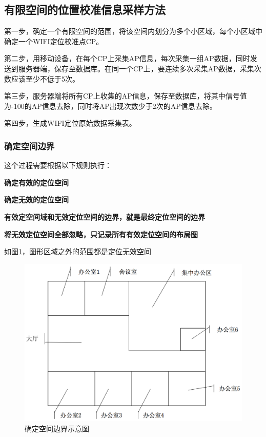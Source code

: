 \documentclass[UTF8, twocolumn ]{ctexart}
\begin{document}
\subsection{有限空间的位置校准信息采样方法}
第一步，确定一个有限空间的范围，将该空间内划分为多个小区域，每个小区域中确定一个WIFI定位校准点CP。
\par
第二步，用移动设备，在每个CP上采集AP信息，每次采集一组AP数据，同时发送到服务器端，保存至数据库。在同一个CP上，要连续多次采集AP数据，采集次数应该至少不低于5次。
\par
第三步，服务器端将所有CP上收集的AP信息，保存至数据库，将其中信号值为-100的AP信息去除，同时将AP出现次数少于2次的AP信息去除。
\par
第四步，生成WIFI定位原始数据采集表。

\subsubsection{确定空间边界}
这个过程需要根据以下规则执行：
\begin{compactitem}
\item\textbf{确定有效的定位空间}
\item\textbf{确定无效的定位空间}
\item\textbf{有效定空间域和无效定位空间的边界，就是最终定位空间的边界}
\item\textbf{将无效定位空间全部忽略，只记录所有有效定位空间的布局图}
\end{compactitem}
\par
如图\ref{fig:2}，图形区域之外的范围都是定位无效空间
\begin{figure}[!ht]\centering
\includegraphics[keepaspectratio, scale=0.2]{no2.png}
\caption{确定空间边界示意图\label{fig:2}} 
\end{figure}
\end{document}
